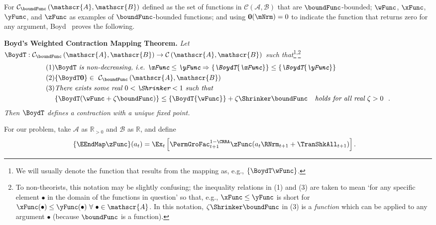 \documentclass[BufferStockTheory]{subfiles}
\begin{document}
For $\mathcal{C}_{\boundFunc}\left( \mathscr{A},\mathscr{B}\right) $ defined as the set of functions in $\mathcal{C}(\mathscr{A},\mathscr{B})$ that are $\boundFunc$-bounded; $\wFunc$, $\xFunc$, $\yFunc$, and $\zFunc$ as examples of $\boundFunc$-bounded functions; and using {$\mathbf{0}(\mNrm)=0$} to indicate the function that returns zero for any argument, Boyd~\citeyearpar{jboydWeighted} proves the following.

\textbf{Boyd's Weighted Contraction Mapping Theorem.} \textit{Let $\BoydT:\mathcal{C}_{\boundFunc }\left( \mathscr{A},\mathscr{B}\right)
  \rightarrow \mathcal{C}\left( \mathscr{A},\mathscr{B}\right) $ such
  that}\footnote{We will usually denote the function that results from the mapping as, e.g., $\{\BoydT\wFunc\}$.}\textsuperscript{,}\footnote{To non-theorists, this notation may be slightly confusing; the inequality relations in (1) and (3) are taken to mean `for any specific element $\bullet$ in the domain of the functions in question' so that, e.g., $\xFunc \leq \yFunc$ is short for $\xFunc(\bullet) \leq \yFunc(\bullet)~\forall~\bullet\in \mathscr{A}$.  In this notation, $\zeta \Shrinker \boundFunc$ in (3) is a \textit{function} which can be applied to any argument $\bullet$ (because $\boundFunc$ is a function).} \nopagebreak
\begin{align*}
  \mbox{(1)} &\BoydT%
               \mbox{ \textit{is non-decreasing, i.e.\ ${\xFunc} \leq {\yFunc}\Rightarrow
               \{\BoydT{\xFunc}\} \leq \{\BoydT{\yFunc}\}$}}   \nonumber \\
  \mbox{(2)} & \{\BoydT\mathbf{0}\}\in ~ \mathcal{C}_{\boundFunc }\left(\mathscr{A},\mathscr{B}\right)  \notag \\
  \mbox{(3)}
             & \mbox{\textit{There exists some real $0 < \Shrinker < 1$ such that}} \\
             & \{\BoydT({\wFunc} +\zeta\boundFunc )\} \leq \{\BoydT{\wFunc}\} +\zeta\Shrinker \boundFunc
               \mbox{ \textit{~~holds for all real $\zeta > 0$ } } .
\end{align*}
\textit{Then $\BoydT$ defines a contraction with a unique fixed point.}

For our problem, take $\mathscr{A}$ as $\mathbb{R}_{>0}$ and $\mathscr{B}$
as $\mathbb{R}$, and define
\begin{align*}
  \{\EEndMap \zFunc\}(a_{t})  & = \Ex_{t}\left[\PermGroFac^{1-\CRRA}_{t+1} \zFunc(a_{t} \RNrm_{t+1} + \TranShkAll_{t+1})\right].
\end{align*}
\end{document}
